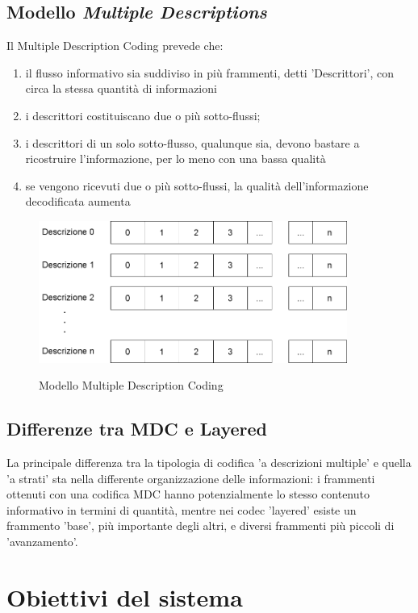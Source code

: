 \subsection{Modello \emph{Multiple Descriptions}}

Il Multiple Description Coding prevede che:
\begin{enumerate}
\item il flusso informativo sia suddiviso in più frammenti, detti 'Descrittori', con circa la stessa quantità di informazioni
\item i descrittori costituiscano due o più sotto-flussi;
\item i descrittori di un solo sotto-flusso, qualunque sia, devono bastare a ricostruire l'informazione, per lo meno con una bassa qualità
\item se vengono ricevuti due o più sotto-flussi, la qualità dell'informazione decodificata aumenta 
\end{enumerate}

\begin{figure}[h]
\includegraphics[width=0.90\textwidth]{../images/modello_mdc.png}
\label{fig:modello_mdc}
\caption{Modello Multiple Description Coding}
\end{figure}
\subsection{Differenze tra MDC e Layered}

La principale differenza tra la tipologia di codifica 'a descrizioni multiple' e
quella 'a strati' sta nella differente organizzazione delle informazioni: i
frammenti ottenuti con una codifica MDC hanno potenzialmente lo stesso contenuto
informativo in termini di quantità, mentre nei codec 'layered' esiste un
frammento 'base', più importante degli altri, e diversi frammenti più piccoli di
'avanzamento'.

\section{Obiettivi del sistema}

